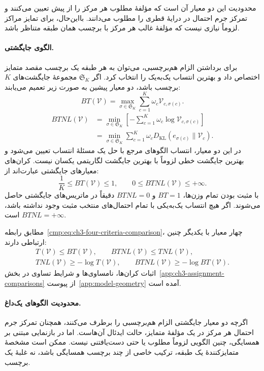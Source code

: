 محدودیت این دو معیار آن است که مؤلفهٔ مطلوب هر
مرکز را از پیش تعیین می‌کنند و تمرکز جرم احتمال
در درایهٔ قطری را مطلوب می‌دانند. بااین‌حال، برای
تمایز مراکز لزوماً نیازی نیست که مؤلفهٔ غالب هر
مرکز با برچسب همان طبقه متناظر باشد.

\paragraph{الگوی جایگشتی.}
برای برداشتن الزام هم‌برچسبی، می‌توان به هر طبقه
یک برچسب مقصد متمایز اختصاص داد و بهترین انتساب
یک‌به‌یک را انتخاب کرد. اگر $\mathfrak{S}_K$ مجموعهٔ
جایگشت‌های $K$ برچسب باشد، دو معیار پیشین به
صورت زیر تعمیم می‌یابند:
\begin{equation}\label{cmp:eq:ch3-best-trace-score}
BT(\mathcal V)=
\max_{\sigma\in\mathfrak{S}_K}
\sum_{c=1}^{K}\omega_c\mathcal V_{c,\sigma(c)}.
\end{equation}
\begin{equation}\label{cmp:eq:ch3-best-trace-log-cost}
\begin{aligned}
BTNL(\mathcal V)
&=\min_{\sigma\in\mathfrak{S}_K}
\left[-\sum_{c=1}^{K}\omega_c\log\mathcal V_{c,\sigma(c)}\right]\\
&=\min_{\sigma\in\mathfrak{S}_K}
\sum_{c=1}^{K}\omega_c
D_{\mathrm{KL}}(e_{\sigma(c)}\|\mathcal V_c).
\end{aligned}
\end{equation}
در این دو معیار، انتساب الگوهای مرجع با حل یک
مسئلهٔ انتساب تعیین می‌شود و بهترین جایگشت خطی
لزوماً با بهترین جایگشت لگاریتمی یکسان نیست.
کران‌های معیارهای جایگشتی عبارت‌اند از:
\[
\frac{1}{K}\le BT(\mathcal V)\le 1,\qquad
0\le BTNL(\mathcal V)\le+\infty.
\]
با مثبت بودن تمام وزن‌ها، $BT=1$ و $BTNL=0$
دقیقاً در ماتریس‌های جایگشتی حاصل می‌شوند.
اگر هیچ انتساب یک‌به‌یکی با تمام احتمال‌های
منتخب مثبت وجود نداشته باشد، $BTNL=+\infty$ است.

مطابق رابطه~\eqref{cmp:eq:ch3-four-criteria-comparison}،
چهار معیار با یکدیگر چنین ارتباطی دارند:
\[
\begin{gathered}
T(\mathcal V)\le BT(\mathcal V),\qquad
BTNL(\mathcal V)\le TNL(\mathcal V),\\
TNL(\mathcal V)\ge-\log T(\mathcal V),\qquad
BTNL(\mathcal V)\ge-\log BT(\mathcal V).
\end{gathered}
\]
اثبات کران‌ها، نامساوی‌ها و شرایط تساوی در
بخش~\ref{app:ch3-assignment-comparisons} از
پیوست~\ref{app:model-geometry} آمده است.

\paragraph{محدودیت الگوهای یک‌داغ.}
اگرچه دو معیار جایگشتی الزام هم‌برچسبی را
برطرف می‌کنند، همچنان تمرکز جرم احتمال هر مرکز
در یک مؤلفهٔ متمایز، حالت ایدئال آن‌هاست.
اما در بازنمایی مبتنی بر همسایگی، چنین الگویی
لزوماً مطلوب یا حتی دست‌یافتنی نیست. ممکن است
مشخصهٔ متمایزکنندهٔ یک طبقه، ترکیب خاصی از
چند برچسب همسایگی باشد، نه غلبهٔ یک برچسب.

